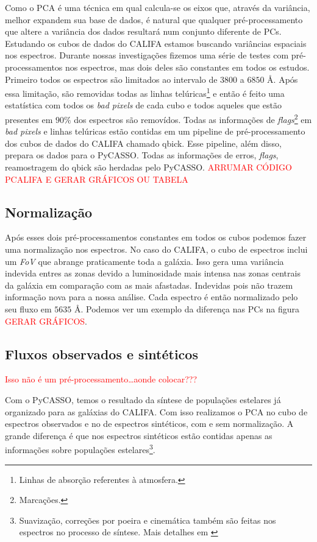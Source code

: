 Como o PCA é uma técnica em qual calcula-se os eixos que, através da variância,
melhor expandem sua base de dados, é natural que qualquer pré-processamento que
altere a variância dos dados resultará num conjunto diferente de PCs. Estudando
os cubos de dados do CALIFA estamos buscando variâncias espaciais nos espectros.
Durante nossas investigações fizemos uma série de testes com pré-processamentos
nos espectros, mas dois deles são constantes em todos os estudos. Primeiro todos
os espectros são limitados ao intervalo de $3800$ a $6850$ \AA. Após essa
limitação, são removidas todas as linhas telúricas\footnote{Linhas de absorção
referentes à atmosfera.} e então é feito uma estatística com todos os {\em bad
pixels} de cada cubo e todos aqueles que estão presentes em $90\%$ dos espectros
são removídos. Todas as informações de {\em flags}\footnote{Marcações.} em {\em
bad pixels} e linhas telúricas estão contidas em um pipeline de
pré-processamento dos cubos de dados do CALIFA chamado {\sc qbick}. Esse
pipeline, além disso, prepara os dados para o PyCASSO. Todas as informações de
erros, {\em flags}, reamostragem do {\sc qbick} são herdadas pelo PyCASSO.
\fixme \textcolor{red}{ARRUMAR CÓDIGO PCALIFA E GERAR GRÁFICOS OU TABELA}

\subsection{Normalização}
\label{sec:UsoPCA:PCAlidades:norm}

Após esses dois pré-processamentos constantes em todos os cubos podemos fazer
uma normalização nos espectros. No caso do CALIFA, o cubo de espectros inclui um
{\em FoV} que abrange praticamente toda a galáxia. Isso gera uma variância
indevida entres as zonas devido a luminosidade mais intensa nas zonas centrais
da galáxia em comparação com as mais afastadas. Indevidas pois não trazem
informação nova para a nossa análise. Cada espectro é então normalizado pelo seu
fluxo em $5635$ \AA. Podemos ver um exemplo da diferença nas PCs na figura
\fixme \textcolor{red}{GERAR GRÁFICOS}.

\subsection{Fluxos observados e sintéticos}
\label{sec:UsoPCA:PCAlidades:flux}

\fixme \textcolor{red}{Isso não é um pré-processamento\ldots aonde colocar???}

Com o PyCASSO, temos o resultado da síntese de populações estelares já
organizado para as galáxias do CALIFA. Com isso realizamos o PCA no cubo de
espectros observados e no de espectros sintéticos, com e sem normalização. A
grande diferença é que nos espectros sintéticos estão contidas apenas as
informações sobre populações estelares\footnote{Suavização, correções por
poeira e cinemática também são feitas nos espectros no processo de síntese. Mais
detalhes em \citet{CidFernandes2005}}.

